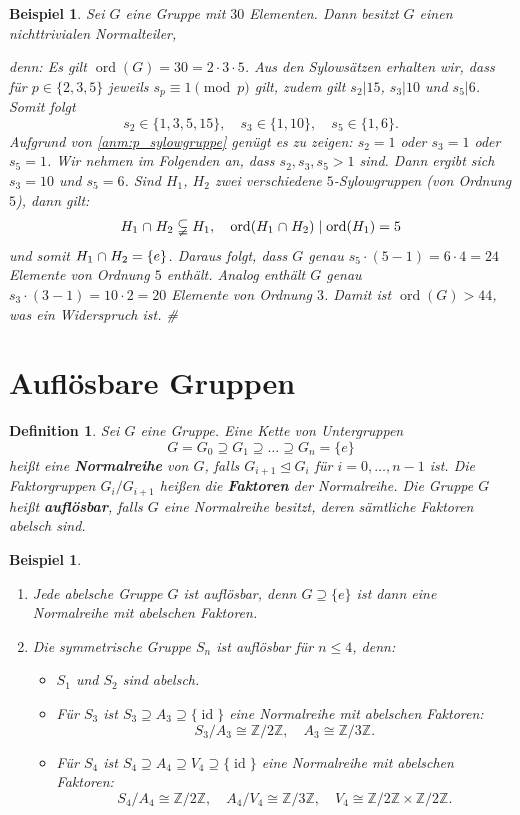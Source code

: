 \documentclass[a4paper, twoside, 11pt, ngerman]{report}
\newcommand{\ZZ}{\mathds Z}
\DeclareMathOperator{\ident}{id}
\DeclareMathOperator{\ord}{ord}
\renewcommand{\cap}{\;\rotatebox{90}{\reflectbox{\rotatebox{270}{$\cup$}}}\;}
\theoremstyle{definistyle}
\newtheorem{defini}[satz]{Definition}
\newtheorem{bsp}[satz]{Beispiel}
\theoremstyle{remark}
\newenvironment{denn}%
  {\par\textit{denn:}}%
  {\hfill\#\par}
\newcommand{\defn}[1]{\textit{\bfseries #1}}
\begin{document}
\begin{bsp}\label{bsp:gruppe-30-elemente}
Sei $G$ eine Gruppe mit $30$ Elementen. Dann besitzt $G$ einen nichttrivialen Normalteiler,
\begin{denn}
Es gilt $\ord(G) = 30 = 2 \cdot 3 \cdot 5$. Aus den Sylowsätzen erhalten wir, dass für $p \in \{2, 3, 5\}$ jeweils $s_p \equiv 1 \pmod{p}$ gilt, zudem gilt $s_2|15$, $s_3|10$ und $s_5|6$. Somit folgt
\[
s_2 \in \{1, 3, 5, 15\}, \quad s_3 \in \{1, 10\}, \quad s_5 \in \{1, 6\}.
\]
Aufgrund von \ref{anm:p_sylowgruppe} genügt es zu zeigen: $s_2 = 1$ oder $s_3 = 1$ oder $s_5 = 1$.
Wir nehmen im Folgenden an, dass $s_2, s_3, s_5 > 1$ sind. Dann ergibt sich $s_3 = 10$ und $s_5 = 6$.
Sind $H_1$, $H_2$ zwei verschiedene $5$-Sylowgruppen (von Ordnung $5$), dann gilt:
\[
H_1\cap H_2\subsetneqq H_1,\quad \ord(H_1 \cap H_2) \mid \ord(H_1) = 5 
\]
und somit $H_1 \cap H_2 = \{e\}$.
Daraus folgt, dass $G$ genau $s_5 \cdot (5 - 1) = 6 \cdot 4 = 24$ Elemente von Ordnung $5$ enthält.
Analog enthält $G$ genau $s_3 \cdot (3 - 1) = 10 \cdot 2 = 20$ Elemente von Ordnung $3$. Damit ist
$\ord(G) > 44$, was ein Widerspruch ist.
\end{denn}
\end{bsp}

\section{Auflösbare Gruppen}

\begin{defini}\label{def:normalreihe}
Sei $G$ eine Gruppe. Eine Kette von Untergruppen
\[
G = G_0 \supseteq G_1 \supseteq \dots \supseteq G_n = \{e\}
\]
heißt eine \defn{Normalreihe} von $G$, falls $G_{i+1} \trianglelefteq G_i$ für $i = 0, \dots, n-1$ ist. Die Faktorgruppen $G_i / G_{i+1}$ heißen die \defn{Faktoren} der Normalreihe.
Die Gruppe $G$ heißt \defn{auflösbar}, falls $G$ eine Normalreihe besitzt, deren sämtliche Faktoren abelsch sind.
\end{defini}

\begin{bsp}\label{bsp:auflösbare-gruppen}
\begin{enumerate}[label=(\alph*)]
\item Jede abelsche Gruppe $G$ ist auflösbar, denn $G \supseteq \{e\}$ ist dann eine Normalreihe mit abelschen Faktoren.
\item Die symmetrische Gruppe $S_n$ ist auflösbar für $n \leq 4$, denn:
\begin{itemize}
\item $S_1$ und $S_2$ sind abelsch.
\item Für $S_3$ ist $S_3 \supseteq A_3 \supseteq \{ \ident \}$ eine Normalreihe mit abelschen Faktoren:
\[
S_3 / A_3 \cong \ZZ / 2 \ZZ, \quad A_3 \cong \ZZ / 3 \ZZ.
\]
\item Für $S_4$ ist $S_4 \supseteq A_4 \supseteq V_4 \supseteq \{\ident\}$ eine Normalreihe mit abelschen Faktoren:
\[
S_4 / A_4 \cong \ZZ / 2 \ZZ, \quad A_4 / V_4 \cong \ZZ / 3 \ZZ, \quad V_4 \cong \ZZ / 2 \ZZ \times \ZZ / 2 \ZZ.
\]
\end{itemize}
\end{enumerate}
\end{bsp}
\end{document}
